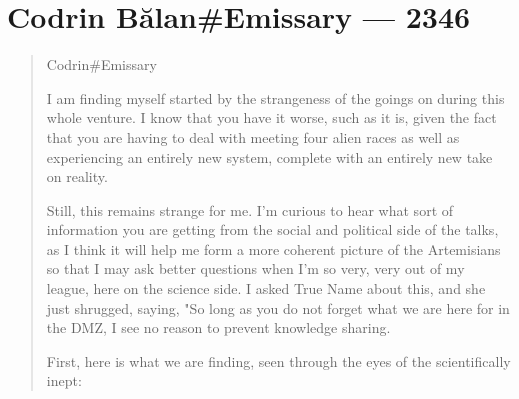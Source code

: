\hypertarget{codrin-bux103lanemissary-2346}{%
\chapter{Codrin Bălan\#Emissary — 2346}\label{codrin-bux103lanemissary-2346}}

\begin{quote}
Codrin\#Emissary

I am finding myself started by the strangeness of the goings on during this whole venture. I know that you have it worse, such as it is, given the fact that you are having to deal with meeting four alien races as well as experiencing an entirely new system, complete with an entirely new take on reality.

Still, this remains strange for me. I'm curious to hear what sort of information you are getting from the social and political side of the talks, as I think it will help me form a more coherent picture of the Artemisians so that I may ask better questions when I'm so very, very out of my league, here on the science side. I asked True Name about this, and she just shrugged, saying, "So long as you do not forget what we are here for in the DMZ, I see no reason to prevent knowledge sharing.

First, here is what we are finding, seen through the eyes of the scientifically inept:


\end{quote}
